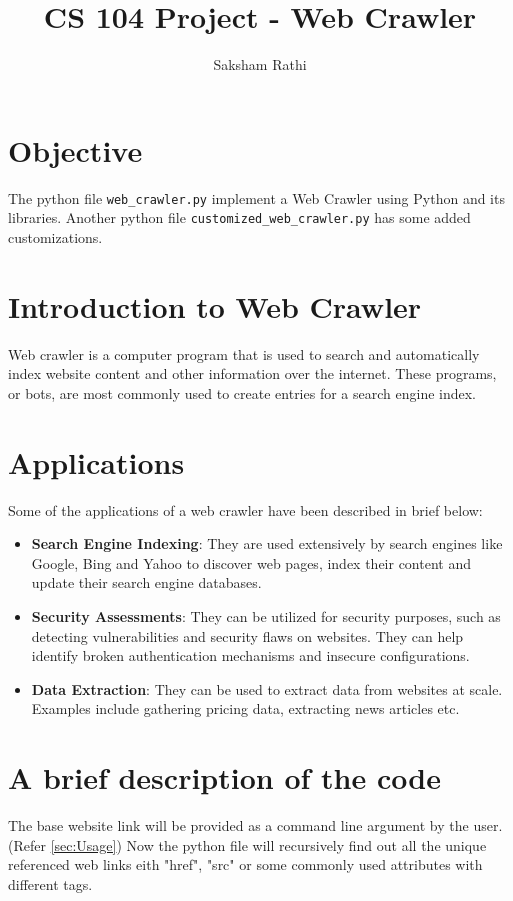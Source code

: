 \documentclass{report}
\begin{document}
\title{CS 104 Project - Web Crawler}
\author{Saksham Rathi}
\maketitle

\tableofcontents

\clearpage

\section{Objective}
The python file \texttt{web\_crawler.py} implement a Web Crawler using Python and its libraries.
Another python file \texttt{customized\_web\_crawler.py} has some added customizations.


\section{Introduction to Web Crawler}
Web crawler is a computer program that is used to search and automatically index website
content and other information over the internet. These programs, or bots, are most commonly
used to create entries for a search engine index.

\section{Applications}
Some of the applications of a web crawler have been described in brief below:
\begin{itemize}
    \item \textbf{Search Engine Indexing}: They are used extensively by search engines like Google, Bing and Yahoo to discover web pages, index their content and update their search engine databases.
    \item \textbf{Security Assessments}: They can be utilized for security purposes, such as detecting vulnerabilities and security flaws on websites. They can help identify broken authentication mechanisms and insecure configurations.
    \item \textbf{Data Extraction}: They can be used to extract data from websites at scale. Examples include gathering pricing data, extracting news articles etc.
\end{itemize}

\section{A brief description of the code}
The base website link will be provided as a command line argument by the user. (Refer \ref{sec:Usage}) Now the python file will recursively find out all the unique referenced web links eith "href", "src" or some commonly used attributes with different tags. 
\end{document}
